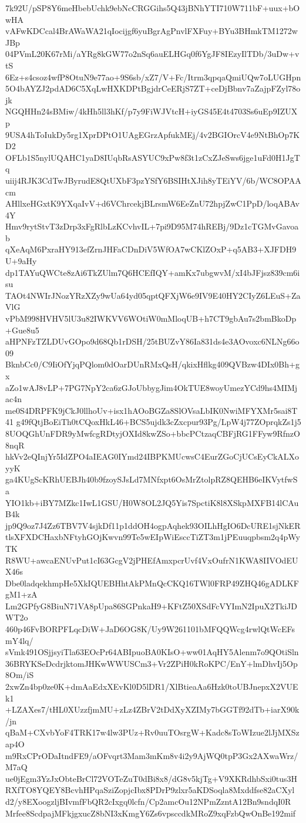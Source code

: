 7k92U/pSP8Y6meHbebUchk9ebNcCRGGihs5Q43jBNhYTI710W711bF+uux+bOwHA
vAFwKDCcal4BrAWaWA21qIocijgf6yuBgrAgPnvlFXFuy+BYu3BHmkTM1272wJBp
04PVmL20K67rMi/aYRg8kGW77o2nSq6auELHGq0f6YgJF8IEzyIlTDb/3uDw+vtS
6Ez+s4csoz4wfP8OtuN9e77ao+9S6sb/xZ7/V+Fc/Itrm3qpqaQmiUQw7oLUGHpn
5O4bAYZJ2pdAD6C5XqLwHXKDPtBgjdrCeERjS7ZT+ceDjBbnv7aZajpFZyl78ojk
NGQHHn24sBMiw/4kHh5ll3hKf/p7y9FiWJVtcH+iyGS45E4t4703Ss6uEp9IZUXp
9USA4hToIukDy5rg1XprDPtO1UAgEGrzApfukMEj/4v2BGIOrcV4e9NtBhOp7KD2
OFLb1S5nylUQAHC1yaD8IUqbRsASYUC9xPw8f3t1zCxZJeSws6jge1uFd0H1JgTq
uiij4RJK3CdTwJByrudE8QtUXbF3pzYSfY6BSIHtXJih8yTEiYV/6b/WC8OPAAcm
AHllxeHGxtK9YXqaIvV+d6VChrcekjBLrsmW6EeZnU72hpjZwC1PpD/loqABAv4Y
Hmv9rytStvT3zDrp3xFgRlbLzKCvhvIL+7pi9D95M74hREBj/9Dz1cTGMvGavoab
qXeAqM6PxraHY913efZrnJHFaCDnDiV5WfOA7wCKlZOxP+q5AB3+XJFDH9U+9aHy
dp1TAYuQWCte8zAi6TkZUlm7Q6HCEfIQY+amKx7ubgwvM/xI4bJFjsz839cm6isu
TAOt4NWIrJNozYRzXZy9wUa64yd05qptQFXjW6e9IV9E40HY2CIyZ6LEuS+ZaVlG
vPbM998HVHV5lU3u82IWKVV6WOtiW0mMloqUB+h7CT9gbAu7s2bmBkoDp+Gue8u5
aHPNFzTZLDUvGOpo9d68Qb1rDSH/25tBUZvY86Ia831ds4e3AOvoxc6NLNg66o09
BknbCc0/C9IiOfYjqPQlom0dOarDUnRMxQsH/qkixHflkg409QVBzw4DIx0Bh+gx
aZo1wAJ8vLP+7PG7NpY2ca6zGJoUbbygJim4OkTUE8woyUmezYCd9hs4MIMjac4n
me0S4DRPFK9jCkJ0llhoUv+isx1hAOoBGZa8SlOVsaLbIK0NwiMFYXMr5sai8T41
g49fQtjBoEiTh0tCQoxHkL46+BCS5ujdk3cZxcpur93Pg/LpW4j77ZOprqkZs1j5
8UOQGhUnFDR9yMwfcgRDtyjOXId8kwZSo+bbcPCtzaqCBFjRG1FFyw9RfnzO8nqR
hkVv2eQInjYr5IdZPO4aIEAG0IYmd24IBPKMUcwsC4EurZGoCjUCsEyCkALXoyyK
ga4KUgScKRhUEBJh40b9fzoySJsLd7MNfxpt6OsMrZtolpRZ8QEHB6eIKVytfwSa
YIO1kb+iBY7MZkc1IwL1GSU/H0W8OL2JQ5Yis7SpctiK8l8XSkpMXFB14lCAuB4k
jp9Q9oz7J4Zz6TBV7V4sjkDf11p1ddOH4ogpAqhek93OILhHgIO6DcURE1sjNkER
tlsXFXDCHaxbNFtyhGOjKwvn99Te5wEIpWiEsccTiZT3m1jPEuuqpbsm2q4pWyTK
R8WU+awcaENUvPut1cI63GcgV2jPHEfAmxpcrUvf4VxOufrN1KWA8IIVOdEUX46s
Dbe0ladqekhmpHe5XkIQUEBHhtAkPMnQcCKQ16TWl0FRP49ZHQ46gADLKFgM1+zA
Lm2GPfyG8BiuN71VA8pUpa86SGPnkaH9+KFtZ50XSdFcVYImN2IpuX2TkiJDWT2o
460p46FvBORPFLqcDiW+JaD6OG8K/Uy9W261101bMFQQWcg4rwlQtWcEFsmY4lq/
sVmk491OSjjsyiTla63EOcPr64ABIpuoBA0KIsO+ww01AqHY5Alenm7o9QOtiSln
36BRYKSeDcdrjktomJHKwWWUSCm3+Vr2ZPiH0kRoKPC/EnY+lmDhvIj5Op8Om/iS
2xwZn4bp0ze0K+dmAaEdxXEvKl0D5lDR1/XlBtieaAa6Hzk0toUBJnepxX2VUEk1
+LZAXes7/tHL0XUzzfjmMU+zLz4ZBrV2tDdXyXZIMy7bGGTf92dTb+iarX90k/jn
qBaM+CXvbYoF4TRK17w4lw3PUz+Rv0uuTOsrgW+Kadc8sToWIzue2lJjMXSzap4O
m9RxCPrODaItndFE9/aOFvqrt3Mam3mKm8v4i2y9AjWQ0tpP3Gx2AXwaWrz/M7aQ
ue0jEgm3YzJxObteBrCl72VOTeZuT0dBi8x8/dG8v5kjTg+V9XKRdhbSxi0tus3H
RXfTO8YQEY8BcvhHPqaSziZopjcIbx8PDrP9zlxr5aKDSoqla8Mxddfse82aCXyl
d2/y8EXoogzljBIvmfFbQR2cIxgq0lcfn/Cp2amcOu12NPmZzntA12Bn9sndqI0R
Mrfee8ScdpajMFkjgxucZ8bNI3xKmgY6Zs6vpsccdkMRoZ9xqFzbQwOnBe192mif
